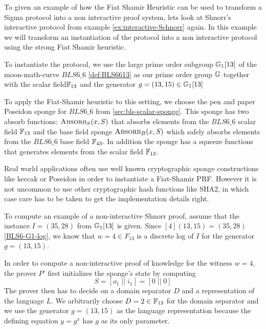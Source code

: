 \begin{example}
\label{ex:Schnorr-SNARK}
To given an example of how the Fiat Shamir Heuristic can be used to transform a Sigma protocol into a non interactive proof system, lets look at Shnorr's interactive protocol from example \ref{ex:interactive-Schnorr} again. In this example we will transform an instantiation of the protocol into a non interactive protocol using the strong Fiat Shamir heuristic.  

To instantiate the protocol, we use the large prime order subgroup $\mathbb{G}_1[13]$ of the moon-math-curve $BLS6\_6$ \ref{def:BLS6613} as our prime order group $\mathbb{G}$ together with the scalar field$\mathbb{F}_{13}$ and the generator $g=(13,15)\in \mathbb{G}_1[13]$

To apply the Fiat-Shamir heuristic to this setting, we choose the pen and paper Poseidon sponge for $BLS6\_6$ from \ref{sec:bls-scalar-sponge}. This sponge has two absorb functions: $\textsc{Absorb}_S(x,S)$ that absorbs elements from the $BLS6\_6$ scalar field $\mathbb{F}_{13}$ and the base field sponge $\textsc{Absorb}_B(x,S)$ which safely absorbs elements from the $BLS6\_6$ base field $\mathbb{F}_{43}$. In addition the sponge has a squeeze functions that generates elements from the scalar field $\mathbb{F}_{13}$.

Real world applications often use well known cryptographic sponge constructions like keccak or Poseidon in order to instantiate a Fiat-Shamir PRF. However it is not uncommon to use other cryptographic hash functions like SHA2, in which case care has to be taken to get the implementation details right. 

To compute an example of a non-interactive Shnorr proof, assume that the instance $I=(35,28)$ from $\mathbb{G}_1[13]$ is given. Since $[4](13,15)=(35,28)$ \ref{BLS6-G1-log}, we know that $w=4\in F_{13}$ is a discrete log of $I$ for the generator $g=(13,15)$. 

In order to compute a non-interactive proof of knowledge for the witness $w=4$, the prover $P'$ first initializes the sponge's state by computing
$$
S=[o_1\;||\;i_1]=[0\;||\;0]
$$
The prover then has to decide on a domain separator $D$ and a representation of the language $L$. We arbitrarily choose $D=2 \in \mathbb{F}_{13}$ for the domain separator and we use the generator $g=(13,15)$ as the language representation because the defining equation $y = g ^x$ has $g$ as its only parameter. 


\end{example}
